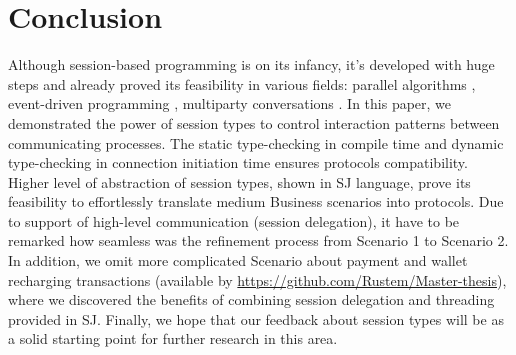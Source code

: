 \documentclass{llncs}
\begin{document}
\section{Conclusion}
\label{sect:conclusion}
Although session-based programming is on its infancy, it's developed with huge steps and already proved its feasibility in various fields: parallel algorithms \cite{sj-parallel}, event-driven programming \cite{event-driven-sj}, multiparty conversations \cite{sj-business-protocols}. In this paper, we demonstrated the power of session types to control interaction patterns between communicating processes. The static type-checking in compile time and dynamic type-checking in connection initiation time ensures protocols compatibility. Higher level of abstraction of session types, shown in SJ language, prove its feasibility to effortlessly translate medium Business scenarios into protocols. Due to support of high-level communication (session delegation), it have to be remarked how seamless was the refinement process from Scenario 1 to Scenario 2. In addition, we omit more complicated Scenario about payment and wallet recharging transactions (available by \url{https://github.com/Rustem/Master-thesis}), where we discovered the benefits of combining session delegation and threading provided in SJ. Finally, we hope that our feedback about session types will be as a solid starting point for further research in this area.  


%
\label{sect:bib}

%
%
%


\appendix




\end{document}
